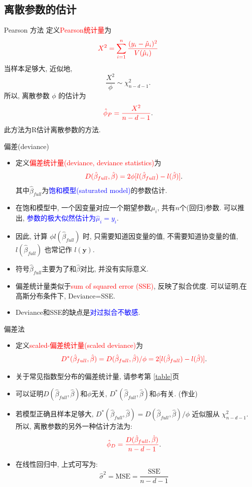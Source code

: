 \documentclass[professionalfont]{beamer}
\newcommand{\red}[1]{\textcolor{red}{#1}}
\newcommand{\blue}[1]{\textcolor{blue}{#1}}
\begin{document}
\subsection{离散参数的估计}
\begin{frame}{Pearson 方法}
定义\red{Pearson统计量}为
$$\red{X^2=\sum_{i=1}^n\frac{(y_i-\hat{\mu}_i)^2}{V(\hat{\mu}_i)}}$$
当样本足够大, 近似地, 
$$\frac{X^2}{\phi}\sim\chi^2_{n-d-1}.$$
所以, 离散参数 $\phi$ 的估计为
$$\red{\hat{\phi}_P=\frac{X^2}{n-d-1}}.$$
此方法为R估计离散参数的方法.
\end{frame}
\begin{frame}{偏差(deviance)}
\begin{itemize}
\item 定义\red{偏差统计量(deviance, deviance statistics)}为
$$\red{D(\hat{\beta}_{full},\hat{\beta})=2\phi[l(\hat{\beta}_{full})-l(\hat{\beta})]}.$$
其中$\hat{\beta}_{full}$为\blue{饱和模型(saturated model)}的参数估计. 
\item 在饱和模型中, 一个因变量对应一个期望参数$\mu_i$, 共有$n$个(回归)参数. 可以推出, \blue{参数的极大似然估计为$\hat{\mu}_i=y_i$}. 
\item 因此, 计算 $\phi l(\hat{\beta}_{full})$ 时, 只需要知道因变量的值, 不需要知道协变量的值,  $l(\hat{\beta}_{full})$ 也常记作 $l(\boldsymbol{y})$. 
\item 符号$\hat{\beta}_{full}$主要为了和$\hat{\beta}$对比, 并没有实际意义.
\item 偏差统计量类似于\red{sum of squared error (SSE)}, 反映了拟合优度. 可以证明,在高斯分布条件下, Deviance=SSE.
\item Deviance和SSE的缺点是\blue{对过拟合不敏感}.
\end{itemize}
\end{frame}
\begin{frame}{偏差法}
	\begin{itemize}
	\item  定义\red{scaled-偏差统计量(scaled deviance)}为
$$\red{D^*(\hat{\beta}_{full},\hat{\beta})=D(\hat{\beta}_{full},\hat{\beta})/\phi=2[l(\hat{\beta}_{full})-l(\hat{\beta})]}.$$
\item 关于常见指数型分布的偏差统计量, 请参考第 \ref{table}页
	\item 可以证明$D(\hat{\beta}_{full},\hat{\beta})$和$\phi$无关, $D^*(\hat{\beta}_{full},\hat{\beta})$和$\phi$有关. (作业)
	\item 若模型正确且样本足够大, $D^*(\hat{\beta}_{full},\hat{\beta})=D(\hat{\beta}_{full},\hat{\beta})/\phi$ 近似服从 $\chi^2_{n-d-1}$. 所以, 离散参数的另外一种估计方法为:
	$$\red{\hat{\phi}_D=\frac{D(\hat{\beta}_{full},\hat{\beta})}{n-d-1}}.$$
	\item 在线性回归中, 上式可写为:
	$$\hat{\sigma}^2=\text{MSE}=\frac{\text{SSE}}{n-d-1}$$
	\end{itemize}
\end{frame}
\end{document}
